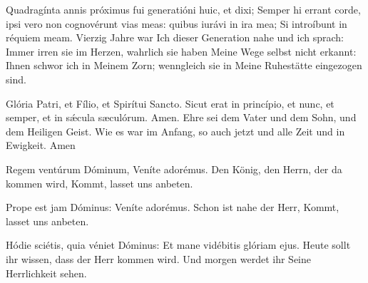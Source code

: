 \documentclass[fontsize=9pt,paper=A6,twoside,BCOR=1mm,DIV=22,headinclude]{scrarticle}
\begin{document}
\vspace{.4em}
\begin{paracol}{2}\pcb
	Quadragínta annis próximus fui generatióni huic, et dixi; Semper hi errant corde, ipsi vero non cognovérunt vias meas: quibus iurávi in ira mea; Si introíbunt in réquiem meam.
	\switchcolumn 
	Vierzig Jahre war Ich dieser Generation nahe und ich sprach: Immer irren sie im Herzen, wahrlich sie haben Meine Wege selbst nicht erkannt: Ihnen schwor ich in Meinem Zorn; wenngleich sie in Meine Ruhestätte eingezogen sind.
\end{paracol}
\vspace{.4em}
\begin{paracol}{2}\pcb
	Glória Patri, et Fílio, et Spirítui Sancto.
	Sicut erat in princípio, et nunc, et semper, et in sǽcula sæculórum. Amen.
	\switchcolumn 
	Ehre sei dem Vater und dem Sohn, und dem Heiligen Geist.
	Wie es war im Anfang, so auch jetzt und alle Zeit und in Ewigkeit. Amen
\end{paracol}
\vfill

\pagebreak
{}

\begin{paracol}{2}\pcb
	Regem ventúrum Dóminum, \red{*} Veníte adorémus.
	\switchcolumn
	Den König, den Herrn, der da kommen wird, \red{*} Kommt, lasset uns anbeten.
\end{paracol}
	
\begin{paracol}{2}\pcb
	Prope est jam Dóminus: \red{*} Veníte adorémus.
	\switchcolumn
	Schon ist nahe der Herr, \red{*} Kommt, lasset uns anbeten.
\end{paracol}

\begin{paracol}{2}\pcb
	Hódie sciétis, quia véniet Dóminus: \red{*} Et mane vidébitis glóriam ejus.
	\switchcolumn
	Heute sollt ihr wissen, dass der Herr kommen wird. \red{*} Und morgen werdet ihr Seine Herrlichkeit sehen.
\end{paracol}
\end{document}
